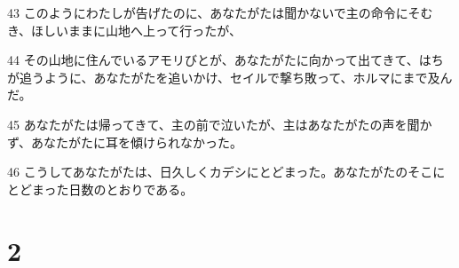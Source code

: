 \par 43 このようにわたしが告げたのに、あなたがたは聞かないで主の命令にそむき、ほしいままに山地へ上って行ったが、
\par 44 その山地に住んでいるアモリびとが、あなたがたに向かって出てきて、はちが追うように、あなたがたを追いかけ、セイルで撃ち敗って、ホルマにまで及んだ。
\par 45 あなたがたは帰ってきて、主の前で泣いたが、主はあなたがたの声を聞かず、あなたがたに耳を傾けられなかった。
\par 46 こうしてあなたがたは、日久しくカデシにとどまった。あなたがたのそこにとどまった日数のとおりである。

\chapter{2}

